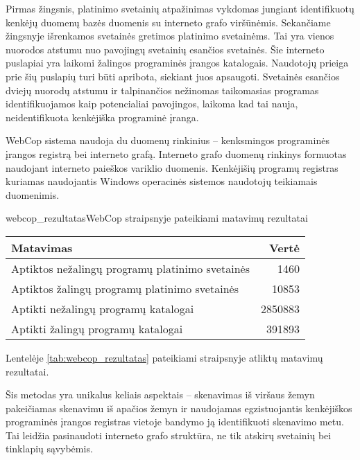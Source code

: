 Pirmas žingsnis, platinimo svetainių atpažinimas vykdomas jungiant identifikuotų kenkėjų duomenų bazės duomenis su interneto grafo viršūnėmis. Sekančiame žingsnyje išrenkamos svetainės gretimos platinimo svetainėms. Tai yra vienos nuorodos atstumu nuo pavojingų svetainių esančios svetainės. Šie interneto puslapiai yra laikomi žalingos programinės įrangos katalogais. Naudotojų prieiga prie šių puslapių turi būti apribota, siekiant juos apsaugoti. Svetainės esančios dviejų nuorodų atstumu ir talpinančios nežinomas taikomasias programas identifikuojamos kaip potencialiai pavojingos, laikoma kad tai nauja, neidentifikuota kenkėjiška programinė įranga.

WebCop sistema naudoja du duomenų rinkinius -- kenksmingos programinės įrangos registrą bei interneto grafą. Interneto grafo duomenų rinkinys formuotas naudojant interneto paieškos variklio duomenis. Kenkėjišių programų registras kuriamas naudojantis Windows operacinės sistemos naudotojų teikiamais duomenimis.

\begin{ktutable}{webcop_rezultatas}{WebCop straipsnyje pateikiami matavimų rezultatai}
    \begin{tabular}{| l | r |}
     \hline
        Matavimas & Vertė \\ \hline
        Aptiktos nežalingų programų platinimo svetainės & 1460 \\ \hline
        Aptiktos žalingų programų platinimo svetainės & 10853 \\ \hline
        Aptikti nežalingų programų katalogai & 2850883 \\ \hline
        Aptikti žalingų programų katalogai & 391893 \\ \hline
    \end{tabular}
\end{ktutable}

Lentelėje \vref{tab:webcop_rezultatas} pateikiami straipsnyje atliktų matavimų rezultatai.

Šis metodas yra unikalus keliais aspektais -- skenavimas iš viršaus žemyn pakeičiamas skenavimu iš apačios žemyn ir naudojamas egzistuojantis kenkėjiškos programinės įrangos registras vietoje bandymo ją identifikuoti skenavimo metu. Tai leidžia pasinaudoti interneto grafo struktūra, ne tik atskirų svetainių bei tinklapių sąvybėmis.